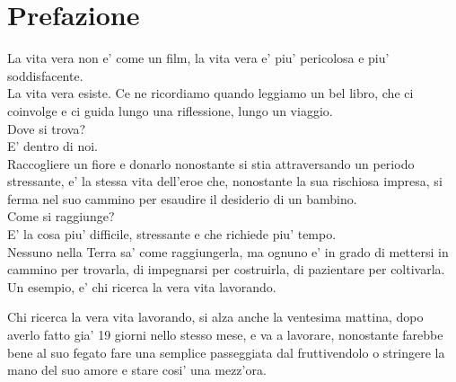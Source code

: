 \chapter{Prefazione}

La vita vera non e' come un film,
la vita vera e' piu' pericolosa
e piu' soddisfacente.\\

La vita vera esiste. Ce ne ricordiamo
quando leggiamo un bel libro,
che ci coinvolge e ci guida lungo una
riflessione, lungo un viaggio.\\

Dove si trova?\\

E' dentro di noi.\\
Raccogliere un fiore e donarlo
nonostante si stia attraversando
un periodo stressante,
e' la stessa vita dell'eroe
che, nonostante la sua rischiosa impresa,
si ferma nel suo cammino per esaudire il desiderio
di un bambino.\\

Come si raggiunge?\\
E' la cosa piu' difficile, stressante e che richiede piu' tempo.\\
Nessuno nella Terra sa' come raggiungerla, ma ognuno e' in grado di mettersi in cammino per trovarla,
di impegnarsi per costruirla, di pazientare per coltivarla.\\
Un esempio, e' chi ricerca la vera vita lavorando.

Chi ricerca la vera vita lavorando, si alza anche la ventesima mattina, dopo averlo fatto gia' 19 giorni nello stesso mese, e va a lavorare, nonostante farebbe bene al suo fegato fare una semplice passeggiata dal fruttivendolo o
stringere la mano del suo amore e stare cosi' una mezz'ora.

